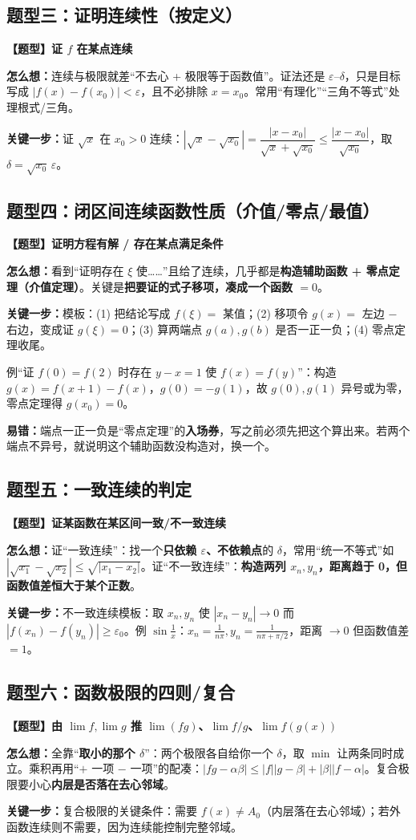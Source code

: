 ﻿\documentclass[11pt,a4paper,UTF8]{ctexart}
\newcommand{\eps}{\varepsilon}
\newcommand{\thm}[1]{\par\smallskip\noindent\colorbox{blue!8}{\textbf{【题型】#1}}\par\smallskip}
\newcommand{\think}[1]{\par\smallskip\noindent\textcolor{purple!75!black}{\textbf{怎么想：}#1}\par\smallskip}
\newcommand{\key}[1]{\par\smallskip\noindent\colorbox{yellow!22}{\textbf{关键一步：}#1}\par\smallskip}
\newcommand{\pit}[1]{\par\smallskip\noindent\textcolor{red!70!black}{\textbf{易错：}#1}\par\smallskip}
\begin{document}
\subsection{题型三：证明连续性（按定义）}

\thm{证 $f$ 在某点连续}
\think{连续与极限就差“不去心 + 极限等于函数值”。证法还是 $\eps$–$\delta$，只是目标写成 $|f(x)-f(x_0)|<\eps$，且不必排除 $x=x_0$。常用“有理化”“三角不等式”处理根式/三角。}
\key{证 $\sqrt x$ 在 $x_0>0$ 连续：$|\sqrt x-\sqrt{x_0}|=\dfrac{|x-x_0|}{\sqrt x+\sqrt{x_0}}\le\dfrac{|x-x_0|}{\sqrt{x_0}}$，取 $\delta=\sqrt{x_0}\,\eps$。}

\subsection{题型四：闭区间连续函数性质（介值/零点/最值）}

\thm{证明方程有解 / 存在某点满足条件}
\think{看到“证明存在 $\xi$ 使……”且给了连续，几乎都是\textbf{构造辅助函数 + 零点定理（介值定理）}。关键是\textbf{把要证的式子移项，凑成一个函数 $=0$}。}
\key{模板：(1) 把结论写成 $f(\xi)=$ 某值；(2) 移项令 $g(x)=$ 左边 $-$ 右边，变成证 $g(\xi)=0$；(3) 算两端点 $g(a),g(b)$ 是否一正一负；(4) 零点定理收尾。}
例“证 $f(0)=f(2)$ 时存在 $y-x=1$ 使 $f(x)=f(y)$”：构造 $g(x)=f(x+1)-f(x)$，$g(0)=-g(1)$，故 $g(0),g(1)$ 异号或为零，零点定理得 $g(x_0)=0$。
\pit{端点一正一负是“零点定理”的\textbf{入场券}，写之前必须先把这个算出来。若两个端点不异号，就说明这个辅助函数没构造对，换一个。}

\subsection{题型五：一致连续的判定}

\thm{证某函数在某区间一致/不一致连续}
\think{证“一致连续”：找一个\textbf{只依赖 $\eps$、不依赖点}的 $\delta$，常用“统一不等式”如 $|\sqrt{x_1}-\sqrt{x_2}|\le\sqrt{|x_1-x_2|}$。证“不一致连续”：\textbf{构造两列 $x_n,y_n$，距离趋于 0，但函数值差恒大于某个正数}。}
\key{不一致连续模板：取 $x_n,y_n$ 使 $|x_n-y_n|\to0$ 而 $|f(x_n)-f(y_n)|\ge\eps_0$。例 $\sin\frac1x$：$x_n=\frac1{n\pi},y_n=\frac1{n\pi+\pi/2}$，距离 $\to0$ 但函数值差 $=1$。}

\subsection{题型六：函数极限的四则/复合}

\thm{由 $\lim f,\lim g$ 推 $\lim(fg)$、$\lim f/g$、$\lim f(g(x))$}
\think{全靠“\textbf{取小的那个 $\delta$}”：两个极限各自给你一个 $\delta$，取 $\min$ 让两条同时成立。乘积再用“$+$ 一项 $-$ 一项”的配凑：$|fg-\alpha\beta|\le|f||g-\beta|+|\beta||f-\alpha|$。复合极限要小心\textbf{内层是否落在去心邻域}。}
\key{复合极限的关键条件：需要 $f(x)\ne A_0$（内层落在去心邻域）；若外函数连续则不需要，因为连续能控制完整邻域。}
\end{document}
